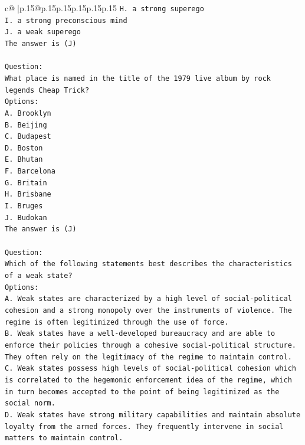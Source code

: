 \documentclass{article}
\begin{document}
{\begin{supertabular}{c@{$\;$}|p{.15\linewidth}@{}p{.15\linewidth}p{.15\linewidth}p{.15\linewidth}p{.15\linewidth}p{.15\linewidth}}
{{{\texttt{H. a strong superego} \\
\texttt{I. a strong preconscious mind} \\
\texttt{J. a weak superego} \\
\texttt{The answer is (J)} \\
\\ 
\texttt{Question:} \\
\texttt{What place is named in the title of the 1979 live album by rock legends Cheap Trick?} \\
\texttt{Options:} \\
\texttt{A. Brooklyn} \\
\texttt{B. Beijing} \\
\texttt{C. Budapest} \\
\texttt{D. Boston} \\
\texttt{E. Bhutan} \\
\texttt{F. Barcelona} \\
\texttt{G. Britain} \\
\texttt{H. Brisbane} \\
\texttt{I. Bruges} \\
\texttt{J. Budokan} \\
\texttt{The answer is (J)} \\
\\ 
\texttt{Question:} \\
\texttt{Which of the following statements best describes the characteristics of a weak state?} \\
\texttt{Options:} \\
\texttt{A. Weak states are characterized by a high level of social{-}political cohesion and a strong monopoly over the instruments of violence. The regime is often legitimized through the use of force.} \\
\texttt{B. Weak states have a well{-}developed bureaucracy and are able to enforce their policies through a cohesive social{-}political structure. They often rely on the legitimacy of the regime to maintain control.} \\
\texttt{C. Weak states possess high levels of social{-}political cohesion which is correlated to the hegemonic enforcement idea of the regime, which in turn becomes accepted to the point of being legitimized as the social norm.} \\
\texttt{D. Weak states have strong military capabilities and maintain absolute loyalty from the armed forces. They frequently intervene in social matters to maintain control.} \\
}}}
\end{supertabular}}
\end{document}

